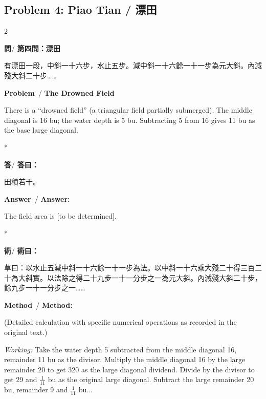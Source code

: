 \documentclass[11pt,a4paper]{article}
\newcommand{\wen}{\textbf{\color{sectioncolor}問}}
\newcommand{\da}{\textbf{\color{answercolor}答}}
\newcommand{\shu}{\textbf{\color{methodcolor}術}}
\newcommand{\prb}{\textbf{\color{sectioncolor}Problem}}
\newcommand{\ans}{\textbf{\color{answercolor}Answer}}
\newcommand{\meth}{\textbf{\color{methodcolor}Method}}
\begin{document}
\vspace{1em}

\subsection*{Problem 4: Piao Tian / 漂田}

\begin{paracol}{2}

\begin{leftcolumn*}
\wen / \textbf{第四問：漂田}

有漂田一段，中斜一十六步，水止五步。減中斜一十六餘一十一步為元大斜。內減殘大斜二十步……
\end{leftcolumn*}

\begin{rightcolumn}
\prb\ / \textbf{The Drowned Field}

There is a ``drowned field'' (a triangular field 
partially submerged). The middle diagonal is 16 bu; the water depth is 
5 bu. Subtracting 5 from 16 gives 11 bu as the base large diagonal.
\end{rightcolumn}

\switchcolumn[0]*

\begin{leftcolumn*}
\da / \textbf{答曰：}

田積若干。
\end{leftcolumn*}

\begin{rightcolumn}
\ans\ / \textbf{Answer:}

The field area is [to be determined].
\end{rightcolumn}

\switchcolumn[0]*

\begin{leftcolumn*}
\shu / \textbf{術曰：}

草曰：以水止五減中斜一十六餘一十一步為法。以中斜一十六乘大殘二十得三百二十為大斜實。以法除之得二十九步一十一分步之一為元大斜。內減殘大斜二十步，餘九步一十一分步之一……
\end{leftcolumn*}

\begin{rightcolumn}
\meth\ / \textbf{Method:}

(Detailed calculation with specific numerical operations as recorded in the original text.)

\textit{Working:} Take the water depth 5 subtracted from the middle diagonal 16, 
remainder 11 bu as the divisor. Multiply the middle diagonal 16 by the large 
remainder 20 to get 320 as the large diagonal dividend. Divide by the divisor 
to get 29 and $\frac{1}{11}$ bu as the original large diagonal. Subtract the 
large remainder 20 bu, remainder 9 and $\frac{1}{11}$ bu...
\end{rightcolumn}

\end{paracol}
\end{document}
